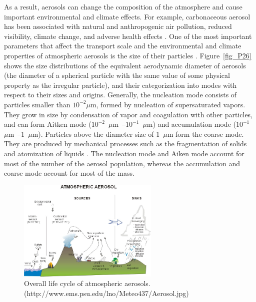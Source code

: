 \documentclass[12pt, fullpage]{uiucthesis2009_2}
\begin{document}
	As a result, aerosols can change the composition of the atmosphere and cause important environmental and climate effects. For example, carbonaceous aerosol has been associated with natural and anthropogenic air pollution, reduced visibility, climate change, and adverse health effects \citep{Mauderly2008}. One of the most important parameters that affect the transport scale and the environmental and climate properties of atmospheric aerosols is the size of their particles \citep{Pacyna1995}. Figure~\ref{fig_P26} shows the size distributions of the equivalent aerodynamic diameter of aerosols (the diameter of a spherical particle with the same value of some physical property as the irregular particle), and their categorization into modes with respect to their sizes and origins. Generally, the nucleation mode consists of particles smaller than $10^{-2}\mu$m, formed by nucleation of supersaturated vapors. They grow in size by condensation of vapor and coagulation with other particles, and can form Aitken mode ($10^{-2}$~$\mu$m~--$10^{-1}$~$\mu$m) and accumulation mode ($10^{-1}$~$\mu$m~--1~$\mu$m). Particles above the diameter size of 1~$\mu$m form the coarse mode. They are produced by mechanical processes such as the fragmentation of solids and atomization of liquids \citep{Pacyna1995,kulmala2004}.
	The nucleation mode and Aiken mode account for most of the number of the aerosol population, whereas the accumulation and coarse mode account for most of the mass. 
	
	\begin{figure}[h] 
		\begin{center}
			\includegraphics[width = 0.6\textwidth]{Figure25}
			\caption[Overall life cycle of atmospheric aerosols]{\label{fig_P25} Overall life cycle of atmospheric aerosols. (http://www.ems.psu.edu/lno/Meteo437/Aerosol.jpg)}
		\end{center}
	\end{figure}
	
\end{document}
